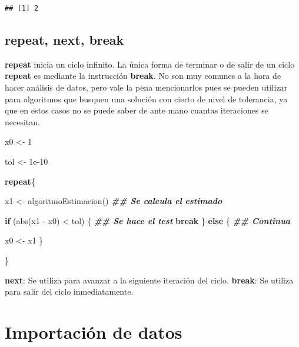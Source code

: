 \documentclass[
  12pt,
]{book}
\newenvironment{Shaded}{\begin{snugshade}}{\end{snugshade}}
\newcommand{\ControlFlowTok}[1]{\textcolor[rgb]{0.13,0.29,0.53}{\textbf{#1}}}
\newcommand{\DecValTok}[1]{\textcolor[rgb]{0.00,0.00,0.81}{#1}}
\newcommand{\DocumentationTok}[1]{\textcolor[rgb]{0.56,0.35,0.01}{\textbf{\textit{#1}}}}
\newcommand{\FloatTok}[1]{\textcolor[rgb]{0.00,0.00,0.81}{#1}}
\newcommand{\FunctionTok}[1]{\textcolor[rgb]{0.00,0.00,0.00}{#1}}
\newcommand{\NormalTok}[1]{#1}
\newcommand{\OtherTok}[1]{\textcolor[rgb]{0.56,0.35,0.01}{#1}}
\newcommand{\SpecialCharTok}[1]{\textcolor[rgb]{0.00,0.00,0.00}{#1}}
\begin{document}
\begin{verbatim}
## [1] 2
\end{verbatim}

\hypertarget{repeat-next-break}{%
\section{\texorpdfstring{\textbf{repeat, next, break}}{repeat, next, break}}\label{repeat-next-break}}

\textbf{repeat} inicia un ciclo infinito. La única forma de terminar o de salir de un ciclo \textbf{repeat} es mediante la instrucción \textbf{break}. No son muy comunes a la hora de hacer análisis de datos, pero vale la pena mencionarlos pues se pueden utilizar para algoritmos que busquen una solución con cierto de nivel de tolerancia, ya que en estos casos no se puede saber de ante mano cuantas iteraciones se necesitan.

\begin{Shaded}
\begin{Highlighting}[]
\NormalTok{x0 }\OtherTok{\textless{}{-}} \DecValTok{1}

\NormalTok{tol }\OtherTok{\textless{}{-}} \FloatTok{1e{-}10}

\ControlFlowTok{repeat}\NormalTok{\{}


\NormalTok{  x1 }\OtherTok{\textless{}{-}} \FunctionTok{algoritmoEstimacion}\NormalTok{() }\DocumentationTok{\#\# Se calcula el estimado}

  \ControlFlowTok{if}\NormalTok{ (}\FunctionTok{abs}\NormalTok{(x1 }\SpecialCharTok{{-}}\NormalTok{ x0) }\SpecialCharTok{\textless{}}\NormalTok{ tol) \{ }\DocumentationTok{\#\# Se hace el test}
    \ControlFlowTok{break}
\NormalTok{  \} }\ControlFlowTok{else}\NormalTok{ \{   }\DocumentationTok{\#\# Continua}

\NormalTok{    x0 }\OtherTok{\textless{}{-}}\NormalTok{ x1}
\NormalTok{  \}}

\NormalTok{\}}
\end{Highlighting}
\end{Shaded}

\textbf{next}: Se utiliza para avanzar a la siguiente iteración del ciclo.
\textbf{break}: Se utiliza para salir del ciclo inmediatamente.

\hypertarget{importaciuxf3n-de-datos}{%
\chapter{\texorpdfstring{\textbf{Importación de datos}}{Importación de datos}}\label{importaciuxf3n-de-datos}}
\end{document}
